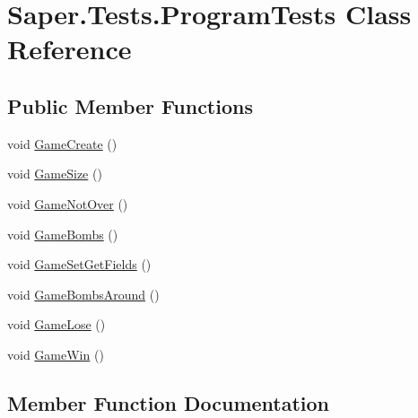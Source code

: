 \hypertarget{class_saper_1_1_tests_1_1_program_tests}{}\section{Saper.\+Tests.\+Program\+Tests Class Reference}
\label{class_saper_1_1_tests_1_1_program_tests}
\subsection*{Public Member Functions}
\begin{DoxyCompactItemize}
\item 
void \mbox{\hyperlink{class_saper_1_1_tests_1_1_program_tests_a9774585fffb849f9c8b33c6e351748d8}{Game\+Create}} ()
\item 
void \mbox{\hyperlink{class_saper_1_1_tests_1_1_program_tests_afef65abd57fa4fd8ef39967855e4c1b2}{Game\+Size}} ()
\item 
void \mbox{\hyperlink{class_saper_1_1_tests_1_1_program_tests_a21d337cc8f3c53f0296a8853c2783818}{Game\+Not\+Over}} ()
\item 
void \mbox{\hyperlink{class_saper_1_1_tests_1_1_program_tests_ad11f91c967457113e7ee5f43c4ff54a1}{Game\+Bombs}} ()
\item 
void \mbox{\hyperlink{class_saper_1_1_tests_1_1_program_tests_afbf5122edc7a9945db74f8ecad4cae41}{Game\+Set\+Get\+Fields}} ()
\item 
void \mbox{\hyperlink{class_saper_1_1_tests_1_1_program_tests_a5385fbe423cd40ca4674ddc0060a2752}{Game\+Bombs\+Around}} ()
\item 
void \mbox{\hyperlink{class_saper_1_1_tests_1_1_program_tests_a8a3221efdf3b62166f012dcf7e1ce68c}{Game\+Lose}} ()
\item 
void \mbox{\hyperlink{class_saper_1_1_tests_1_1_program_tests_a9a2abea95633c70b2845c44e017399cb}{Game\+Win}} ()
\end{DoxyCompactItemize}


\subsection{Member Function Documentation}
\mbox{\label{class_saper_1_1_tests_1_1_program_tests_ad11f91c967457113e7ee5f43c4ff54a1}} 
